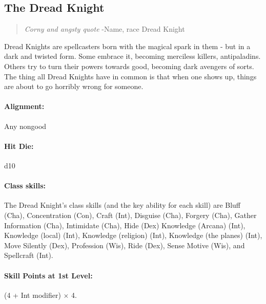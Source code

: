 \subsection[Dread Knight]{The Dread Knight}
\begin{quote}
\emph{Corny and angsty quote}
-Name, race Dread Knight
\end{quote}

Dread Knights are spellcasters born with the magical spark in them - but in a dark and twisted form.
Some embrace it, becoming merciless killers, antipaladins.
Others try to turn their powers towards good, becoming dark avengers of sorts.
The thing all Dread Knights have in common is that when one shows up, things are about to go horribly wrong for someone.
\paragraph{Alignment:} Any nongood
\paragraph{Hit Die:} d10
\paragraph{Class skills:}
The Dread Knight's class skills (and the key ability for each skill) are Bluff (Cha), Concentration (Con), Craft (Int), Disguise (Cha), Forgery (Cha), Gather Information (Cha), Intimidate (Cha), Hide (Dex) Knowledge (Arcana) (Int), Knowledge (local) (Int), Knowledge (religion) (Int), Knowledge (the planes) (Int), Move Silently (Dex), Profession (Wis), Ride (Dex), Sense Motive (Wis), and Spellcraft (Int).

\paragraph{Skill Points at 1st Level:} (4 + Int modifier) $\times$ 4.
